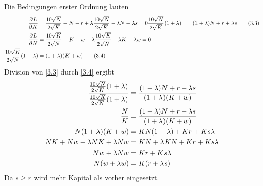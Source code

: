 \documentclass{article}
\begin{document}
\begin{enumerate}[label=(\alph*)]
		Die Bedingungen erster Ordnung lauten
		\begin{align}
			\frac{\partial L}{\partial K} &= \frac{10\sqrt{N}}{2\sqrt{K}} - N - r + \lambda\frac{10\sqrt{N}}{2\sqrt{K}} - \lambda N - \lambda s = 0 \notag
			\label{3.3}
			\frac{10\sqrt{N}}{2\sqrt{K}} (1+\lambda) &= (1+\lambda)N + r + \lambda s \tag{3.3} \\
			\frac{\partial L}{\partial N} &= \frac{10\sqrt{K}}{2\sqrt{N}} - K - w + \lambda\frac{10\sqrt{K}}{2\sqrt{N}} - \lambda K - \lambda w = 0 \notag \\
			\label{3.4}
			\frac{10\sqrt{K}}{2\sqrt{N}}(1+\lambda) &= (1+\lambda)(K+w) \tag{3.4}
		\end{align}
		Division von \eqref{3.3} durch \eqref{3.4} ergibt
		\begin{align}
			\frac{\frac{10\sqrt{N}}{2\sqrt{K}} (1+\lambda)}{\frac{10\sqrt{K}}{2\sqrt{N}}(1+\lambda)} &= \frac{(1+\lambda)N + r + \lambda s}{(1+\lambda)(K+w)} \notag \\
			\frac{N}{K} &= \frac{(1+\lambda)N + r + \lambda s}{(1+\lambda)(K+w)} \notag \\
			N(1+\lambda)(K+w) &= KN(1+\lambda) + Kr + Ks\lambda \notag \\
			NK + Nw + \lambda NK + \lambda Nw &= KN + \lambda KN + Kr + Ks\lambda \notag \\
			Nw + \lambda Nw &= Kr + Ks\lambda \notag \\
			N(w+\lambda w) &= K(r+\lambda s) \notag
		\end{align}
		Da $s\ge r$ wird mehr Kapital als vorher eingesetzt.
	\end{enumerate}
\end{document}

